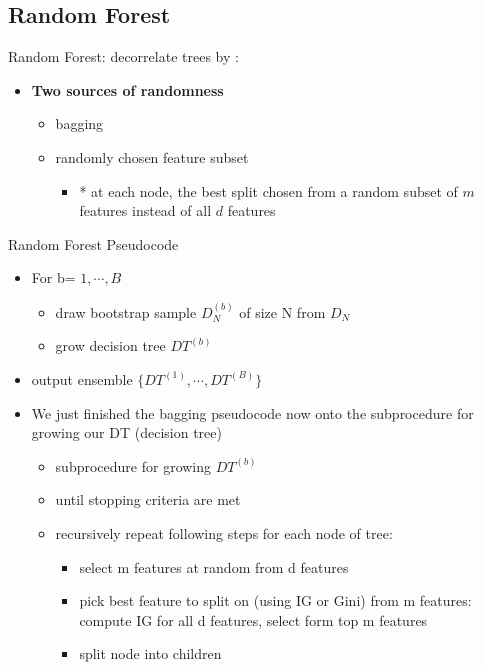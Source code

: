 \documentclass[10pt, oneside]{article}
\begin{document}
\subsection{Random Forest}
Random Forest: decorrelate trees by :
\begin{itemize}
    \item \textbf{Two sources of randomness}
    \begin{itemize}
        \item bagging
        \item randomly chosen feature subset
        \begin{itemize}
            \item * at each node, the best split chosen from a random subset of $m$ features instead of all $d$ features
        \end{itemize}
    \end{itemize}
\end{itemize}
Random Forest Pseudocode
\begin{itemize}
    \item For b= $1, \cdots, B$
    \begin{itemize}
        \item draw bootstrap sample $D_N^{(b)}$ of size N from $D_N$
        \item grow decision tree $DT^{(b)}$
    \end{itemize}
    \item output ensemble $\{DT^{(1)}, \cdots, DT^{(B)}\}$
    \item We just finished the bagging pseudocode now onto the subprocedure for growing our DT (decision tree)
    \begin{itemize}
        \item subprocedure for growing $DT^{(b)}$
        \item until stopping criteria are met
        \item recursively repeat following steps for each node of tree:
        \begin{itemize}
            \item select m features at random from d features
            \item pick best feature to split on (using IG or Gini) from m features: compute IG for all d features, select form top m features
            \item split node into children
        \end{itemize}
    \end{itemize}
\end{itemize}
\end{document}
